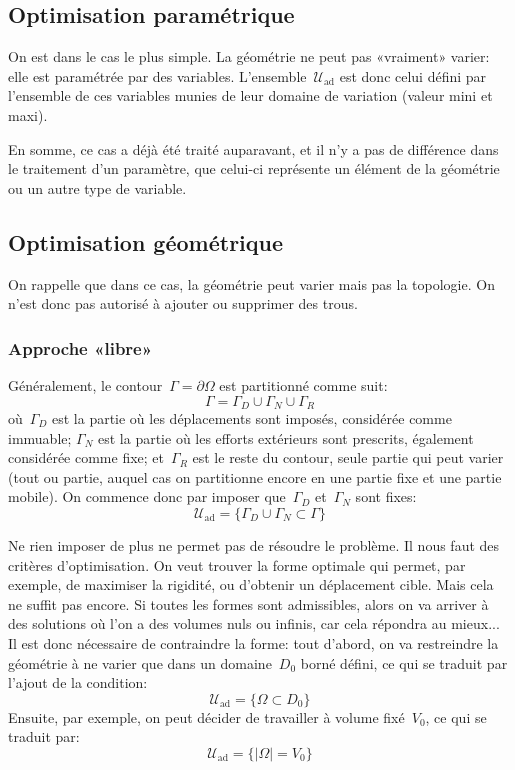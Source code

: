 \medskip
\subsection{Optimisation paramétrique}

On est dans le cas le plus simple. La géométrie ne peut pas «vraiment» varier: elle est paramétrée par des variables. L'ensemble~$\mathscr{U}_{\text{ad}}$ est donc celui défini par l'ensemble de ces variables munies de leur domaine de variation (valeur mini et maxi).

En somme, ce cas a déjà été traité auparavant, et il n'y a pas de différence dans le traitement d'un paramètre, que celui-ci représente un élément de la géométrie ou un autre type de variable.

\medskip
\subsection{Optimisation géométrique}

On rappelle que dans ce cas, la géométrie peut varier mais pas la topologie. On n'est donc pas autorisé à ajouter ou supprimer des trous.

\medskip
\subsubsection{Approche «libre»}

Généralement, le contour~$\Gamma=\partial\Omega$ est partitionné comme suit:
\begin{equation}
\Gamma = \Gamma_D \cup \Gamma_N \cup \Gamma_R
\end{equation}
où~$\Gamma_D$ est la partie où les déplacements sont imposés, considérée comme immuable; $\Gamma_N$ est la partie où les efforts extérieurs sont prescrits, également considérée comme fixe; et~$\Gamma_R$ est le reste du contour, seule partie qui peut varier (tout ou partie, auquel cas on partitionne encore en une partie fixe et une partie mobile).
On commence donc par imposer que~$\Gamma_D$ et~$\Gamma_N$ sont fixes:
\begin{equation}
\mathscr{U}_{\text{ad}}=\{ \Gamma_D \cup \Gamma_N \subset \Gamma\}
\end{equation}

Ne rien imposer de plus ne permet pas de résoudre le problème. Il nous faut des critères d'optimisation.
On veut trouver la forme optimale qui permet, par exemple, de maximiser la rigidité, ou d'obtenir un déplacement cible.
Mais cela ne suffit pas encore. Si toutes les formes sont admissibles, alors on va arriver à des solutions où l'on a des volumes nuls ou infinis, car cela répondra au mieux...
Il est donc nécessaire de contraindre la forme: 
tout d'abord, on va restreindre la géométrie à ne varier que dans un domaine~$D_0$ borné défini, ce qui se traduit par l'ajout de la condition:
\begin{equation}
\mathscr{U}_{\text{ad}}=\{ \Omega\subset D_0 \}
\end{equation}
Ensuite, par exemple, on peut décider de travailler à volume fixé~$V_0$, ce qui se traduit par:
\begin{equation}
\mathscr{U}_{\text{ad}}=\{ |\Omega|=V_0\}
\end{equation}

